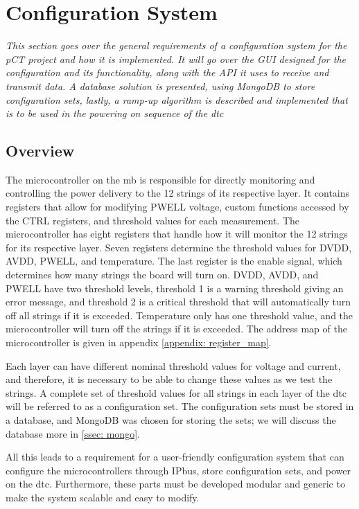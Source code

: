 \documentclass[main.tex]{subfiles}
\begin{document}
\section{Configuration System}
\label{section: configuration}
\textit{This section goes over the general requirements of a configuration system for the pCT project and how it is implemented. It will go over the GUI designed for the configuration and its functionality, along with the API it uses to receive and transmit data. A database solution is presented, using MongoDB to store configuration sets, lastly, a ramp-up algorithm is described and implemented that is to be used in the powering on sequence of the \gls{dtc} }



\subsection{Overview}
The microcontroller on the \gls{mb} is responsible for directly monitoring and controlling the power delivery to the 12 strings of its respective layer. It contains registers that allow for modifying PWELL voltage, custom functions accessed by the CTRL registers, and threshold values for each measurement. The microcontroller has eight registers that handle how it will monitor the 12 strings for its respective layer. Seven registers determine the threshold values for DVDD, AVDD, PWELL, and temperature. The last register is the enable signal, which determines how many strings the board will turn on. DVDD, AVDD, and PWELL have two threshold levels, threshold 1 is a warning threshold giving an error message, and threshold 2 is a critical threshold that will automatically turn off all strings if it is exceeded. Temperature only has one threshold value, and the microcontroller will turn off the strings if it is exceeded. The address map of the microcontroller is given in appendix \ref{appendix: register_map}.

Each layer can have different nominal threshold values for voltage and current, and therefore, it is necessary to be able to change these values as we test the strings. A complete set of threshold values for all strings in each layer of the \gls{dtc} will be referred to as a configuration set. The configuration sets must be stored in a database, and MongoDB was chosen for storing the sets; we will discuss the database more in \autoref{ssec: mongo}.

All this leads to a requirement for a user-friendly configuration system that can configure the microcontrollers through IPbus, store configuration sets, and power on the \gls{dtc}. Furthermore, these parts must be developed modular and generic to make the system scalable and easy to modify.
\end{document}

